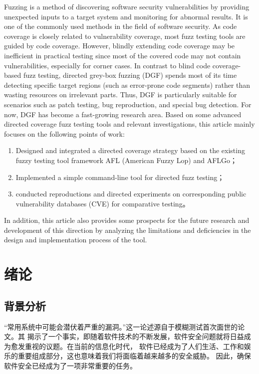 \documentclass[bachelor]{njupthesis}
\begin{document}
\begin{englishabstract}
Fuzzing is a method of discovering software security vulnerabilities by providing 
unexpected inputs to a target system and monitoring for abnormal results. It is one of the 
commonly used methods in the field of software security. As code coverage is closely related 
to vulnerability coverage, most fuzz testing tools are guided by code coverage. However, blindly 
extending code coverage may be inefficient in practical testing since most of the covered code 
may not contain vulnerabilities, especially for corner cases.  In contrast to blind code coverage-based 
fuzz testing, directed grey-box fuzzing (DGF) spends most of its time detecting specific target regions 
(such as error-prone code segments) rather than wasting resources on irrelevant parts. 
Thus, DGF is particularly suitable for scenarios such as patch testing, bug reproduction, and 
special bug detection. For now, DGF has become a fast-growing research area.  Based on some advanced 
directed coverage fuzz testing tools and relevant investigations, this article mainly focuses on the 
following points of work:
\begin{enumerate}[label=(\arabic*),leftmargin=48pt]
	\item Designed and integrated a directed coverage strategy based on the existing fuzzy testing tool framework AFL (American Fuzzy Lop) and AFLGo；
	\item Implemented a simple command-line tool for directed fuzz testing；
	\item conducted reproductions and directed experiments on corresponding public vulnerability databases (CVE) for comparative testing。
\end{enumerate}

In addition, this article also provides some prospects for the future research and development of this direction by 
analyzing the limitations and deficiencies in the design and implementation process of the tool.


\end{englishabstract}

\thesistableofcontents

\thesischapterexordium

\chapter{绪论}
\section{背景分析}
“常用系统中可能会潜伏着严重的漏洞\cite{miller1990empirical}。”这一论述源自于模糊测试首次面世的论文。其
揭示了一个事实，即随着软件技术的不断发展，软件安全问题就将日益成为愈发重视的议题。在当前的信息化时代，
软件已经成为了人们生活、工作和娱乐的重要组成部分，这也意味着我们将面临着越来越多的安全威胁。
因此，确保软件安全已经成为了一项非常重要的任务。
\end{document}
